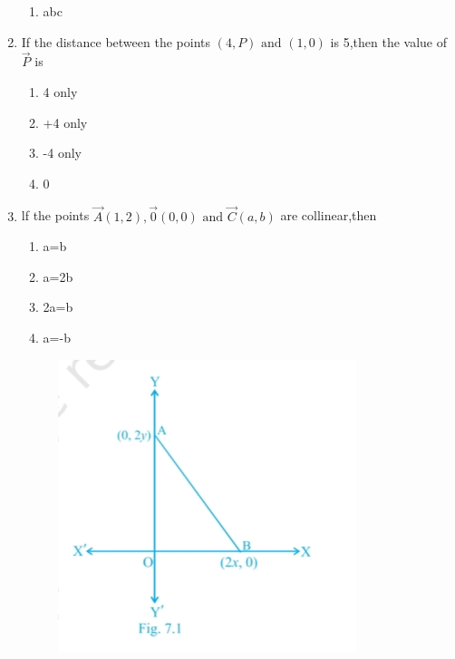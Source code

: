 \begin{enumerate}[label=\thesection.\arabic*,ref=\thesection.\theenumi]
\begin{enumerate}
\item abc 
\end{enumerate}
\item If the distance between the points $(4,P) \text{ and } (1,0)$ is 5,then the value of $\vec{P}$ is
\begin{enumerate}                       
\item4 only
\item+4 only
\item-4 only
\item0
\end{enumerate}
\item lf the points $\vec{A}(1,2),\vec{0}(0,0)\text{ and }\vec{C}(a,b)$ are collinear,then
\begin{enumerate}
\item a=b
\item a=2b
\item 2a=b
\item a=-b
\end{enumerate}
\begin{figure}[h!]
  \centering
  \includegraphics[width=\columnwidth]{exemplar/10/7/1/figs/image.jpg}
  \caption{}
\label{fig:10/7/12Fig1}
\end{figure}

	\end{enumerate}
